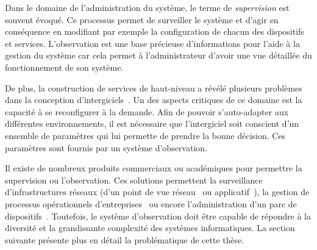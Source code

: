 Dans le domaine de l'administration du système, le terme de \textit{supervision} est souvent évoqué. Ce processus permet de surveiller le système et d'agir en conséquence en modifiant par exemple la configuration de chacun des dispositifs et services. L'observation est une base précieuse d'informations pour l'aide à la gestion du système car cela permet à l'administrateur d'avoir une vue détaillée du fonctionnement de son système.

De plus, la construction de services de haut-niveau a révélé plusieurs problèmes dans la conception d'intergiciels~\cite{Geihs:challenges}. Un des aspects critiques de ce domaine est la capacité à se reconfigurer à la demande. Afin de pouvoir s'auto-adapter aux différentes environnements, il est nécessaire que l'intergiciel soit conscient d'un ensemble de paramètres qui lui permette de prendre la bonne décision. Ces paramètres sont fournis par un système d'observation.

Il existe de nombreux produits commerciaux ou académiques pour permettre la supervision ou l'observation. Ces solutions permettent la surveillance d'infrastructures réseaux (d'un point de vue réseau~\cite{url:zabbix} ou applicatif~\cite{url:manageengine}), la gestion de processus opérationnels d'entreprises~\cite{url:systar} ou encore l'administration d'un parc de dispositifs~\cite{IETF:SNMP}. Toutefois, le système d'observation doit être capable de répondre à la diversité et la grandissante complexité des systèmes informatiques. La section suivante présente plus en détail la problématique de cette thèse.